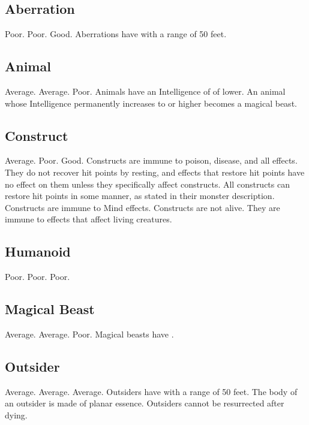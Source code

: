     \subsection{Aberration}
         Poor.
         Poor.
         Good.
         Aberrations have  with a range of 50 feet.

    \subsection{Animal}
         Average.
         Average.
         Poor.
         Animals have an Intelligence of  of lower.
        An animal whose Intelligence permanently increases to  or higher becomes a magical beast.

    \subsection{Construct}
         Average.
         Poor.
         Good.
         Constructs are immune to poison, disease, and all  effects.
        They do not recover hit points by resting, and effects that restore hit points have no effect on them unless they specifically affect constructs.
        All constructs can restore hit points in some manner, as stated in their monster description.
         Constructs are immune to Mind effects.
         Constructs are not alive.
        They are immune to effects that affect living creatures.

    \subsection{Humanoid}
         Poor.
         Poor.
         Poor.

    \subsection{Magical Beast}
         Average.
         Average.
         Poor.
         Magical beasts have .

    \subsection{Outsider}
         Average.
         Average.
         Average.
         Outsiders have  with a range of 50 feet.
         The body of an outsider is made of planar essence.
        Outsiders cannot be resurrected after dying.

